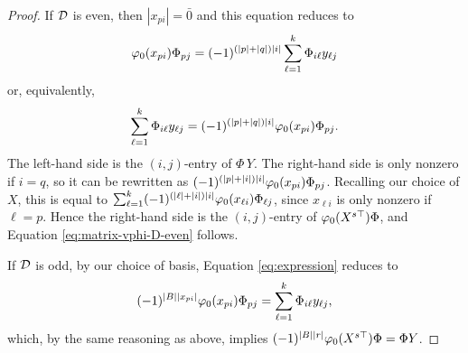 \begin{proof}
	If $\mathcal{D}$ is even, then $|x_{pi}| = \bar 0$ and this equation reduces to
	\[              \varphi_0(x_{pi}) \Phi_{pj} = (-1)^{ (|p| + |q|) |i| } \sum_{\ell=1}^k \Phi_{i \ell} y_{\ell j}
	\]
	or, equivalently,
	\[
		\sum_{\ell=1}^k \Phi_{i \ell} y_{\ell j} = (-1)^{ (|p| + |q|) |i| } \varphi_0(x_{pi}) \Phi_{pj}.
	\]
	The left-hand side is the $(i,j)$-entry of $\Phi\, Y$.
	The right-hand side is only nonzero if $i = q$, so it can be rewritten as
	$(-1)^{ (|p| + |i|) |i| } \varphi_0(x_{pi}) \Phi_{pj}$.
	Recalling our choice of $X$, this is equal to $\sum_{\ell =1}^k (-1)^{ (|\ell| + |i|) |i| } \varphi_0(x_{\ell i}) \Phi_{\ell j}$, since $x_{\ell i}$ is only nonzero if $\ell = p$.
	Hence the right-hand side is the $(i,j)$-entry of $\varphi_0 (X^{s\top}) \Phi$, and Equation \eqref{eq:matrix-vphi-D-even} follows.

	If $\mathcal{D}$ is odd, by our choice of basis, Equation \eqref{eq:expression} reduces to
	\[
		(-1)^{|B| |x_{pi}|} \varphi_0(x_{pi}) \Phi_{pj} =  \sum_{\ell=1}^k \Phi_{i \ell} y_{\ell j},
	\]
	which, by the same reasoning as above, implies $(-1)^{|B||r|} \varphi_0(X^{s\top}) \Phi = \Phi Y$. 
\end{proof}


